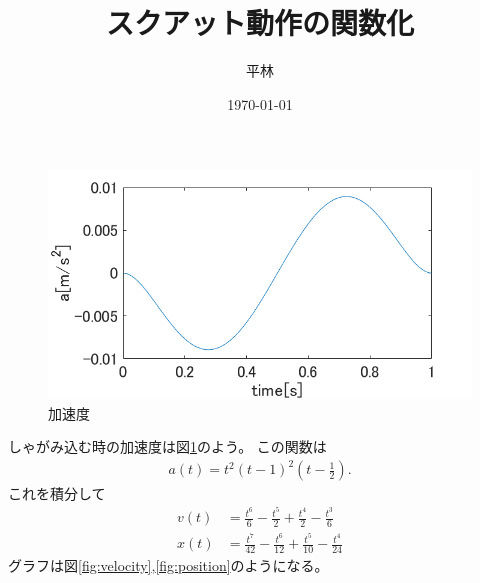 \documentclass[a4paper,11pt]{jsarticle}
\begin{document}
\title{スクアット動作の関数化}
\author{平林}
\date{\today}
\maketitle

\begin{figure}[h]
  \centering
  \includegraphics[width = 1\textwidth]{acceleration.png}
  \caption{加速度}
  \label{fig:acceleration}
\end{figure}
しゃがみ込む時の加速度は図\ref{fig:acceleration}のよう。
この関数は
\begin{align*}
  a(t) = t^2{\left(t-1\right)}^2\left(t-\frac{1}{2}\right).
\end{align*}
これを積分して
\begin{align*}
  v(t) &= \frac{t^6}{6}-\frac{t^5}{2}+\frac{t^4}{2}-\frac{t^3}{6} \\
  x(t) &= \frac{t^7}{42}-\frac{t^6}{12}+\frac{t^5}{10}-\frac{t^4}{24}
\end{align*}
グラフは図\ref{fig:velocity},\ref{fig:position}のようになる。
\end{document}
